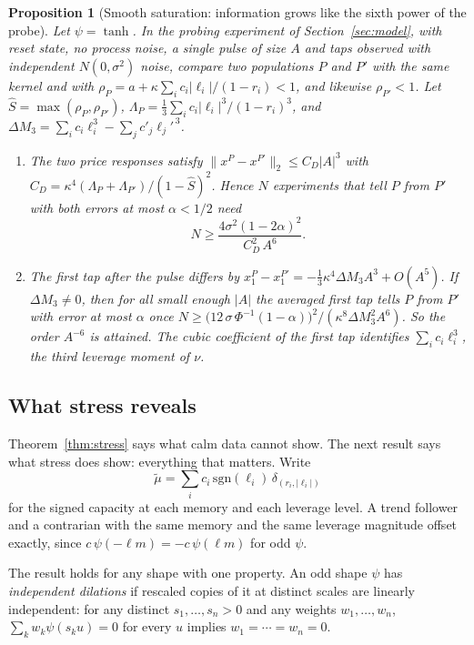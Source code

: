 \documentclass[12pt]{article}
\newtheorem{proposition}[theorem]{Proposition}
\theoremstyle{definition}
\theoremstyle{remark}
\begin{document}
\begin{proposition}[Smooth saturation: information grows like the sixth power of the probe]\label{prop:smooth}
Let $\psi=\tanh$. In the probing experiment of Section~\ref{sec:model}, with reset state, no process noise, a single pulse of size $A$ and taps observed with independent $N(0,\sigma^2)$ noise, compare two populations $P$ and $P'$ with the same kernel and with $\rho_P=a+\kappa\sum_ic_i|\ell_i|/(1-r_i)<1$, and likewise $\rho_{P'}<1$. Let $\hat S=\max(\rho_P,\rho_{P'})$, $\Lambda_P=\tfrac13\sum_ic_i|\ell_i|^3/(1-r_i)^3$, and $\Delta M_3=\sum_ic_i\ell_i^3-\sum_jc'_j\ell_j'^{\,3}$.
\begin{enumerate}[label=(\roman*),itemsep=1pt]
\item The two price responses satisfy $\|x^P-x^{P'}\|_2\le C_D|A|^3$ with $C_D=\kappa^4(\Lambda_P+\Lambda_{P'})/(1-\hat S)^2$. Hence $N$ experiments that tell $P$ from $P'$ with both errors at most $\alpha<1/2$ need
\[
 N\ge\frac{4\sigma^2(1-2\alpha)^2}{C_D^2\,A^6}.
\]
\item The first tap after the pulse differs by $x_1^P-x_1^{P'}=-\tfrac13\kappa^4\Delta M_3A^3+O(A^5)$. If $\Delta M_3\ne0$, then for all small enough $|A|$ the averaged first tap tells $P$ from $P'$ with error at most $\alpha$ once $N\ge\bigl(12\,\sigma\,\Phi^{-1}(1-\alpha)\bigr)^2/(\kappa^8\Delta M_3^2A^6)$. So the order $A^{-6}$ is attained. The cubic coefficient of the first tap identifies $\sum_ic_i\ell_i^3$, the third leverage moment of $\nu$.
\end{enumerate}
\end{proposition}



\subsection{What stress reveals}

Theorem~\ref{thm:stress} says what calm data cannot show. The next result says what stress does show: everything that matters. Write
\[
 \tilde\mu=\sum_ic_i\,\mathrm{sgn}(\ell_i)\,\delta_{(r_i,|\ell_i|)}
\]
for the signed capacity at each memory and each leverage level. A trend follower and a contrarian with the same memory and the same leverage magnitude offset exactly, since $c\,\psi(-\ell m)=-c\,\psi(\ell m)$ for odd $\psi$.

The result holds for any shape with one property. An odd shape $\psi$ has \emph{independent dilations} if rescaled copies of it at distinct scales are linearly independent: for any distinct $s_1,\ldots,s_n>0$ and any weights $w_1,\ldots,w_n$, $\sum_kw_k\psi(s_ku)=0$ for every $u$ implies $w_1=\cdots=w_n=0$.
\end{document}
